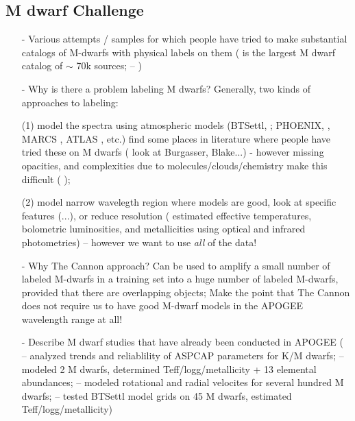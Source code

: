 \documentclass[modern]{aastex62}
\begin{document}
\subsection{M dwarf Challenge}
\begin{enumerate}
\item[-] Various attempts / samples for which people have tried to make substantial catalogs of M-dwarfs with physical labels on them (\citealt{West:2011} is the largest M dwarf catalog of $\sim$ 70k sources; \citealt{Deacon:2014} -- \color{red}{Need citations!}\color{black}) 

\item[-] Why is there a problem labeling M dwarfs? Generally, two kinds of approaches to labeling:

 (1) model the spectra using atmospheric models (BTSettl, \citealt{Allard:2011}; PHOENIX, \citealt{Husser:2013}, MARCS \citealt{Gustafsson:2008}, ATLAS \citealt{Castelli:2004}, etc.) find some places in literature where people have tried these on M dwarfs (\color{red}{Need citations... }\color{black} look at Burgasser, Blake...) - however missing opacities, and complexities due to molecules/clouds/chemistry make this difficult (\color{red}{Need citations... }\color{black} \citealt{Allard:2013}); 

 (2) model narrow wavelegth region where models are good, look at specific features (\citealt{Rojas-Ayala:2012}...), or reduce resolution (\citealt{Casagrande:2008} estimated effective temperatures, bolometric luminosities, and metallicities using optical and infrared photometries) -- however we want to use \emph{all} of the data!


\item[-] Why The Cannon approach? Can be used to amplify a small number of labeled M-dwarfs in a training set into a huge number of labeled M-dwarfs, provided that there are overlapping objects; Make the point that The Cannon does not require us to have good M-dwarf models in the APOGEE wavelength range at all!

\item[-] Describe M dwarf studies that have already been conducted in APOGEE (\citealt{Schmidt:2016} -- analyzed trends and reliablility of ASPCAP parameters for K/M dwarfs; \citealt{Souto:2017} -- modeled 2 M dwarfs, determined Teff/logg/metallicity + 13 elemental abundances; \citealt{Desphande:2013} -- modeled rotational and radial velocites for several hundred M dwarfs; \citealt{Rajpurohit:2018} -- tested BTSettl model grids on 45 M dwarfs, estimated Teff/logg/metallicity)

\end{enumerate}
\end{document}
